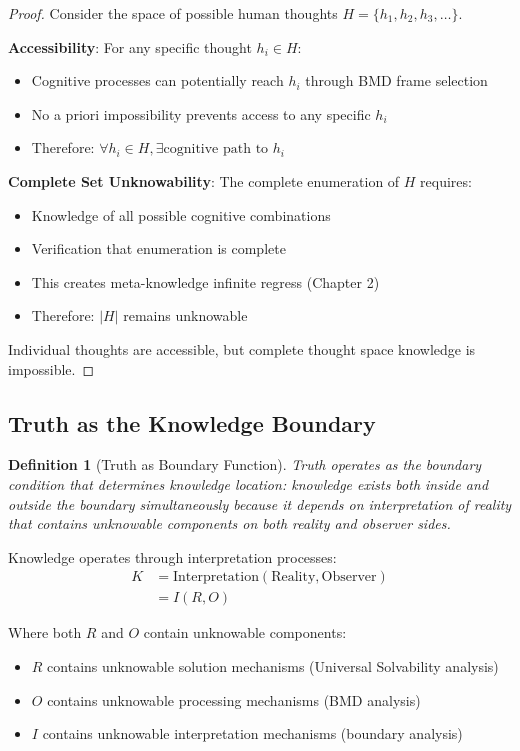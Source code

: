 \documentclass[12pt,a4paper]{article}
\newtheorem{definition}[theorem]{Definition}
\begin{document}
\begin{proof}
Consider the space of possible human thoughts $H = \{h_1, h_2, h_3, \ldots\}$.

\textbf{Accessibility}: For any specific thought $h_i \in H$:
\begin{itemize}
\item Cognitive processes can potentially reach $h_i$ through BMD frame selection
\item No a priori impossibility prevents access to any specific $h_i$
\item Therefore: $\forall h_i \in H, \exists \text{cognitive path to } h_i$
\end{itemize}

\textbf{Complete Set Unknowability}: The complete enumeration of $H$ requires:
\begin{itemize}
\item Knowledge of all possible cognitive combinations
\item Verification that enumeration is complete
\item This creates meta-knowledge infinite regress (Chapter 2)
\item Therefore: $|H|$ remains unknowable
\end{itemize}

Individual thoughts are accessible, but complete thought space knowledge is impossible.
\end{proof}

\subsection{Truth as the Knowledge Boundary}

\begin{definition}[Truth as Boundary Function]
Truth operates as the boundary condition that determines knowledge location: knowledge exists both inside and outside the boundary simultaneously because it depends on interpretation of reality that contains unknowable components on both reality and observer sides.
\end{definition}

Knowledge operates through interpretation processes:
\begin{align}
K &= \text{Interpretation}(\text{Reality}, \text{Observer}) \\
&= I(R, O)
\end{align}

Where both $R$ and $O$ contain unknowable components:
\begin{itemize}
\item $R$ contains unknowable solution mechanisms (Universal Solvability analysis)
\item $O$ contains unknowable processing mechanisms (BMD analysis)  
\item $I$ contains unknowable interpretation mechanisms (boundary analysis)
\end{itemize}
\end{document}
